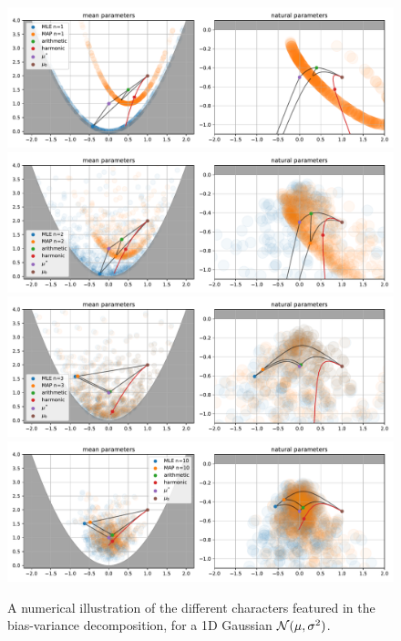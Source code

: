 \documentclass{article}
\begin{document}
\begin{figure}[p]
	\centering
	\includegraphics[width=\textwidth]{figs/thales/numerical_schema_n=1.pdf}
	\includegraphics[width=\textwidth]{figs/thales/numerical_schema_n=2.pdf}
	\includegraphics[width=\textwidth]{figs/thales/numerical_schema_n=3.pdf}
	\includegraphics[width=\textwidth]{figs/thales/numerical_schema_n=10.pdf}
	\caption{A numerical illustration of the different characters featured in the bias-variance decomposition, for a 1D Gaussian ${\mathcal N}(\mu, \sigma^2)$.}
	\label{app:fig:bias-variance-numerical}
\end{figure}
\end{document}
